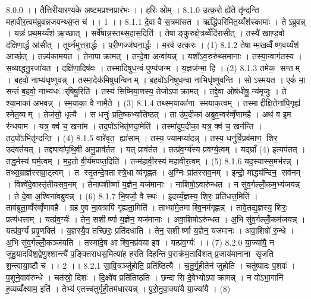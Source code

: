 8.0.0
।। तैत्तिरीयारण्यके अष्टमप्रश्नप्रारंभः ।। हरिः ओम् ।
8.1.0
उ॒त्क॒रो ह्ये॑ते तृ॑न्दन्ति महावीर॒त्वम॑ब्रुवन्नजयन्थ्स॒प्त च॑ ।। 1 ।।
8.1.1
दे॒वा वै स॒त्रमा॑सत । ऋद्धि॑परिमित॒य्यँश॑स्कामाः । तेऽब्रुवन्न् । यन्नः॑ प्रथ॒मय्यँश॑ ऋ॒च्छात् । सर्वे॑षान्न॒स्तथ्स॒हास॒दिति॑ । तेषाङ्कुरुक्षे॒त्रव्वेँदि॑रासीत् । तस्यै॑ खाण़्ड॒वो द॑क्षिणा॒र्द्ध आ॑सीत् । तूर्घ्न॑मुत्तरा॒र्द्धः । प॒री॒णज्ज॑घना॒र्द्धः । म॒रव॑ उत्क॒रः । (1)
8.1.2
तेषाम्म॒खव्वैँष्ण॒वय्यँश॑ आर्च्छत् । तन्न्य॑कामयत । तेनापाक्रामत् । तन्दे॒वा अन्वा॑यन्न् । यशो॑ऽव॒रुरु॑थ्समानाः । तस्या॒न्वाग॑तस्य । स॒व्याद्धनु॒रजा॑यत । दक्षि॑णा॒दिष॑वः । तस्मा॑दिषुध॒न्वं पुण्य॑जन्म । य॒ज्ञज॑न्मा॒ हि । (2)
8.1.3
तमेक॒॒ सन्तम् । ब॒हवो॒ नाभ्य॑धृष्णुवन्न् । तस्मा॒देक॑मिषुध॒न्विनम् । ब॒हवो॑ऽनिषुध॒न्वा नाभिधृ॑ष्णुवन्ति । सोऽस्मयत । एकं॑ मा॒ सन्तं॑ ब॒हवो॒ नाभ्य॑धर््षिषु॒रिति॑ । तस्य॑ सिष्मिया॒णस्य॒ तेजोऽपाक्रामत् । तद्दे॒वा ओष॑धीषु॒ न्य॑मृजुः । ते श्या॒माका॑ अभवन्न् । स्म॒याका॒ वै नामै॒ते । (3)
8.1.4
तथ्स्म॒याका॑ना स्मयाक॒त्वम् । तस्माद्दीक्षि॒तेना॑पि॒गृह्य॑ स्मेत॒व्यम् । तेज॑सो॒ धृत्यै । स धनुः॑ प्रति॒ष्कभ्या॑तिष्ठत् । ता उ॑प॒दीका॑ अब्रुव॒न्वर॑व्वृँणामहै । अथ॑ व इ॒म र॑न्धयाम । यत्र॒ क्व॑ च॒ खना॑म । तद॒पो॑ऽभितृ॑णदा॒मेति॑ । तस्मा॑दुप॒दीका॒ यत्र॒ क्व॑ च॒ खन॑न्ति । तद॒पो॑ऽभितृ॑न्दन्ति । (4)
8.1.5
वारे॑वृत॒॒ ह्या॑साम् । तस्य॒ ज्यामप्या॑दन्न् । तस्य॒ धनु॑र्वि॒प्रव॑माण॒॒ शिर॒ उद॑वर्तयत् । तद्द्यावा॑पृथि॒वी अनु॒प्राव॑र्तत । यत् प्राव॑र्तत । तत्प्र॑व॒र्ग्य॑स्य प्रवर्ग्य॒त्वम् । यद्घ्राँ (4) इत्यप॑तत् । तद्ध॒र्मस्य॑ घर्म॒त्वम् । म॒ह॒तो वी॒र्य॑मपप्त॒दिति॑ । तन्म॑हावी॒रस्य॑ महावीर॒त्वम् । (5)
8.1.6
यद॒स्यास्स॒मभ॑रन्न् । तथ्स॒म्राज्ञ॑स्सम्रा॒ट्त्वम् । त स्तृ॒तन्दे॒वतास्त्रे॒धा व्य॑गृह्णत । अ॒ग्निः प्रा॑तस्सव॒नम् । इन्द्रो॒ माद्ध्य॑न्दिन॒॒ सव॑नम् । विश्वे॑दे॒वास्तृ॑तीयसव॒नम् । तेनाप॑शीर्ष्णा य॒ज्ञेन॒ यज॑मानाः । नाशिषो॒ऽवारु॑न्धत । न सु॑व॒र्गल्लोँ॒कम॒भ्य॑जयन्न् । ते दे॒वा अ॒श्विना॑वब्रुवन्न् । (6)
8.1.7
भि॒षजौ॒ वै स्थः॑ । इ॒दय्यँ॒ज्ञस्य॒ शिरः॒ प्रति॑धत्त॒मिति॑ । ताव॑ब्रूता॒व्वँर॑व्वृँणावहै । ग्रह॑ ए॒व ना॒वत्रापि॑ गृह्यता॒मिति॑ । ताभ्या॑मे॒तमाश्वि॒नम॑गृह्णन्न् । तावे॒तद्य॒ज्ञस्य॒ शिरः॒ प्रत्य॑धत्ताम् । यत्प्र॑व॒र्ग्यः॑ । तेन॒ सशीर्ष्णा य॒ज्ञेन॒ यज॑मानाः । अवा॒शिषोऽरु॑न्धत । अ॒भि सु॑व॒र्गल्लोँ॒कम॑जयन्न् । यत्प्र॑व॒र्ग्यं॑ प्रवृ॒णक्ति॑ । य॒ज्ञस्यै॒व तच्छिरः॒ प्रति॑दधाति । तेन॒ सशीर्ष्णा य॒ज्ञेन॒ यज॑मानः । अवा॒शिषो॑ रु॒न्धे । अ॒भि सु॑व॒र्गल्लोँ॒कञ्ज॑यति । तस्मा॑दे॒ष आश्वि॒नप्र॑वया इव । यत्प्र॑व॒र्ग्यः॑ ।। (7)
8.2.0
या॒ज्या॑यै॒ न जु॑हु॒यादवि॑श॒द्वेणु॒श्शान्त्यै॑ प॒ङ्क्तिरा॑धस॒मित्या॑ह हरति दिहन्ति प॒राक्र॑म॒तावि॑शत् प्र॒जाय॑मानाना सृजति श॒न्त्वाया॒ष्टौ च॑ ।। 2 ।।
8.2.1
सा॒वि॒त्रञ्जु॑होति॒ प्रति॑ष्ठित्यै । च॒तु॒र्गृ॒ही॒तेन॑ जुहोति । चतु॑ष्पादः प॒शवः॑ । प॒शूने॒वाव॑रुन्धे । चत॑स्रो॒ दिशः॑ । दि॒क्ष्वे॑व प्रति॑तिष्ठति । छन्दा॑सि दे॒वेभ्योऽपाक्रामन्न् । न वो॑ऽभा॒गानि॑ ह॒व्यव्वँ॑क्ष्याम॒ इति॑ । तेभ्य॑ ए॒तच्च॑तुर्गृही॒तम॑धारयन्न् । पु॒रो॒नु॒वा॒क्या॑यै या॒ज्या॑यै । (8)
